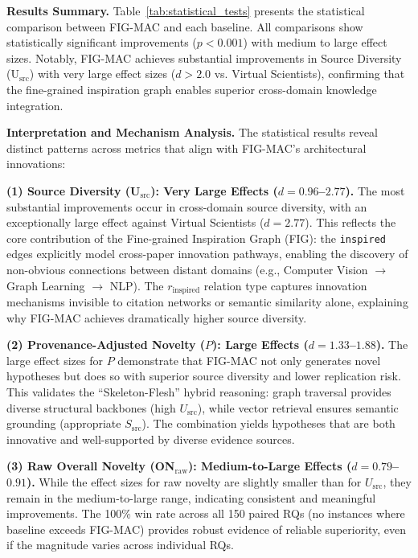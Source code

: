 \documentclass[runningheads]{llncs}
\begin{document}
\textbf{Results Summary.} Table~\ref{tab:statistical_tests} presents the statistical comparison between FIG-MAC and each baseline. All comparisons show statistically significant improvements ($p < 0.001$) with medium to large effect sizes. Notably, FIG-MAC achieves substantial improvements in Source Diversity (U$_{\text{src}}$) with very large effect sizes ($d > 2.0$ vs. Virtual Scientists), confirming that the fine-grained inspiration graph enables superior cross-domain knowledge integration.

\textbf{Interpretation and Mechanism Analysis.} The statistical results reveal distinct patterns across metrics that align with FIG-MAC's architectural innovations:

\textbf{(1) Source Diversity (U$_{\text{src}}$): Very Large Effects ($d = 0.96$--$2.77$).} The most substantial improvements occur in cross-domain source diversity, with an exceptionally large effect against Virtual Scientists ($d = 2.77$). This reflects the core contribution of the Fine-grained Inspiration Graph (FIG): the \texttt{inspired} edges explicitly model cross-paper innovation pathways, enabling the discovery of non-obvious connections between distant domains (e.g., Computer Vision $\rightarrow$ Graph Learning $\rightarrow$ NLP). The $r_{\text{inspired}}$ relation type captures innovation mechanisms invisible to citation networks or semantic similarity alone, explaining why FIG-MAC achieves dramatically higher source diversity.

\textbf{(2) Provenance-Adjusted Novelty ($P$): Large Effects ($d = 1.33$--$1.88$).} The large effect sizes for $P$ demonstrate that FIG-MAC not only generates novel hypotheses but does so with superior source diversity and lower replication risk. This validates the ``Skeleton-Flesh'' hybrid reasoning: graph traversal provides diverse structural backbones (high $U_{\text{src}}$), while vector retrieval ensures semantic grounding (appropriate $S_{\text{src}}$). The combination yields hypotheses that are both innovative and well-supported by diverse evidence sources.

\textbf{(3) Raw Overall Novelty (ON$_{\text{raw}}$): Medium-to-Large Effects ($d = 0.79$--$0.91$).} While the effect sizes for raw novelty are slightly smaller than for $U_{\text{src}}$, they remain in the medium-to-large range, indicating consistent and meaningful improvements. The 100\% win rate across all 150 paired RQs (no instances where baseline exceeds FIG-MAC) provides robust evidence of reliable superiority, even if the magnitude varies across individual RQs.
\end{document}
